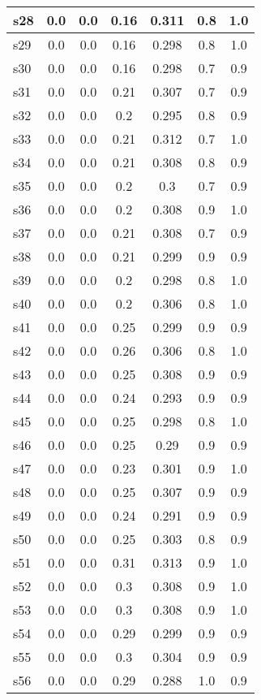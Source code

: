 \documentclass{article}
\begin{document}
\begin{tabular}{|l|c|c|c|c|c|c|}
\hline
s28 &0.0 & 0.0 & 0.16 & 0.311 & 0.8 & 1.0\\
\hline
s29 &0.0 & 0.0 & 0.16 & 0.298 & 0.8 & 1.0\\
\hline
s30 &0.0 & 0.0 & 0.16 & 0.298 & 0.7 & 0.9\\
\hline
s31 &0.0 & 0.0 & 0.21 & 0.307 & 0.7 & 0.9\\
\hline
s32 &0.0 & 0.0 & 0.2 & 0.295 & 0.8 & 0.9\\
\hline
s33 &0.0 & 0.0 & 0.21 & 0.312 & 0.7 & 1.0\\
\hline
s34 &0.0 & 0.0 & 0.21 & 0.308 & 0.8 & 0.9\\
\hline
s35 &0.0 & 0.0 & 0.2 & 0.3 & 0.7 & 0.9\\
\hline
s36 &0.0 & 0.0 & 0.2 & 0.308 & 0.9 & 1.0\\
\hline
s37 &0.0 & 0.0 & 0.21 & 0.308 & 0.7 & 0.9\\
\hline
s38 &0.0 & 0.0 & 0.21 & 0.299 & 0.9 & 0.9\\
\hline
s39 &0.0 & 0.0 & 0.2 & 0.298 & 0.8 & 1.0\\
\hline
s40 &0.0 & 0.0 & 0.2 & 0.306 & 0.8 & 1.0\\
\hline
s41 &0.0 & 0.0 & 0.25 & 0.299 & 0.9 & 0.9\\
\hline
s42 &0.0 & 0.0 & 0.26 & 0.306 & 0.8 & 1.0\\
\hline
s43 &0.0 & 0.0 & 0.25 & 0.308 & 0.9 & 0.9\\
\hline
s44 &0.0 & 0.0 & 0.24 & 0.293 & 0.9 & 0.9\\
\hline
s45 &0.0 & 0.0 & 0.25 & 0.298 & 0.8 & 1.0\\
\hline
s46 &0.0 & 0.0 & 0.25 & 0.29 & 0.9 & 0.9\\
\hline
s47 &0.0 & 0.0 & 0.23 & 0.301 & 0.9 & 1.0\\
\hline
s48 &0.0 & 0.0 & 0.25 & 0.307 & 0.9 & 0.9\\
\hline
s49 &0.0 & 0.0 & 0.24 & 0.291 & 0.9 & 0.9\\
\hline
s50 &0.0 & 0.0 & 0.25 & 0.303 & 0.8 & 0.9\\
\hline
s51 &0.0 & 0.0 & 0.31 & 0.313 & 0.9 & 1.0\\
\hline
s52 &0.0 & 0.0 & 0.3 & 0.308 & 0.9 & 1.0\\
\hline
s53 &0.0 & 0.0 & 0.3 & 0.308 & 0.9 & 1.0\\
\hline
s54 &0.0 & 0.0 & 0.29 & 0.299 & 0.9 & 0.9\\
\hline
s55 &0.0 & 0.0 & 0.3 & 0.304 & 0.9 & 0.9\\
\hline
s56 &0.0 & 0.0 & 0.29 & 0.288 & 1.0 & 0.9\\

\end{tabular}
\end{document}
